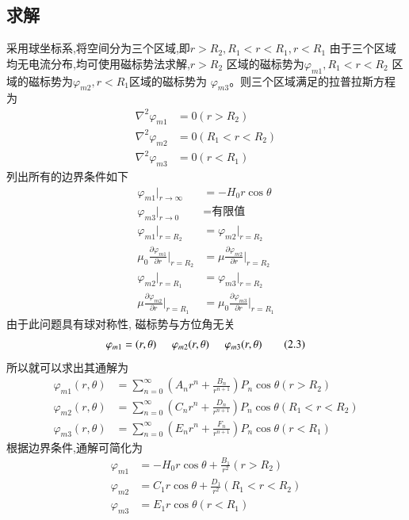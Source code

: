 \documentclass{article}
\begin{document}
\subsection{求解}
采用球坐标系,将空间分为三个区域,即$ r>R_{2},R_{1}<r<R_{1},r<R_{1}$
由于三个区域均无电流分布,均可使用磁标势法求解,$ r>R_{2} $ 区域的磁标势为$ \varphi_{m1},R_{1}<r<R_{2} $
区域的磁标势为$ \varphi_{m2},r<R_{1} $区域的磁标势为 $ \varphi_{m3} $。则三个区域满足的拉普拉斯方程为
\begin{align}
 \nabla^{2}\varphi _{m1}&=0(r>R_{2})\tag{2.1.a}\\  
 \nabla^{2}\varphi _{m2}&=0(R_{1}<r<R_{2})\tag{2.1.b}\\  
 \nabla^{2}\varphi _{m3}&=0(r<R_{1}) \tag{2.1.c}
\end{align}
列出所有的边界条件如下
\begin{align}
\varphi_{m1}|_{r \rightarrow \infty}&=-H_{0}r \cos \theta \tag{2.2.a}\\  
\varphi_{m3}|_{r \rightarrow 0} &=\text{有限值}\tag{2.2.b}\\ 
\varphi_{m1}|_{r=R_{2}}&= \varphi _{m2}|_{r=R_{2}} \tag{2.2.c}\\ 
\mu_{0}\frac{\partial \varphi _{m1}}{\partial r}|_{r=R_{2}}&= \mu \frac{\partial \varphi _{m2}}{\partial r}|_{r=R_{2}} \tag{2.2.d}\\ 
\varphi_{m2}|_{r=R_{1}}&= \varphi _{m3}|_{r=R_{2}} \tag{2.2.e}\\ 
\mu \frac{\partial \varphi _{m2}}{\partial r}|_{r=R_{1}}&= \mu _{0}\frac{\partial \varphi _{m3}}{\partial r}|_{r=R_{1}} \tag{2.2.f} 
\end{align}
由于此问题具有球对称性, 磁标势与方位角无关
\begin{equation}
    \varphi_{m1}=(r, \theta)\hspace{0.5cm}  \varphi _{m2}(r, \theta)\hspace{0.5cm}   \varphi _{m3}(r, \theta)\tag{2.3}
\end{equation}
所以就可以求出其通解为
\begin{align}
    \varphi_{m1}(r, \theta)&= \sum _{n=0}^{\infty}(A_{n}r^{n}+ \frac{B_{n}}{r^{n+1}})P_{n}\cos \theta(r>R_{2}) \tag{2.4.a}\\
 \varphi_{m2}(r, \theta)&= \sum _{n=0}^{\infty}(C_{n}r^{n}+ \frac{D_{n}}{r^{n+1}})P_{n}\cos \theta(R_{1}<r<R_{2}) \tag{2.4.b}\\
\varphi_{m3}(r, \theta)&= \sum _{n=0}^{\infty}(E_{n}r^{n}+ \frac{F_{n}}{r^{n+1}})P_{n}\cos \theta(r<R_{1})  \tag{2.4.c}
\end{align}
根据边界条件,通解可简化为
\begin{align}
    \varphi_{m1}&=-H_{0}r \cos \theta + \frac{B_{1}}{r^{2}}  (r>R_{2})  \tag{2.5.a}\\
    \varphi_{m2}&=C_{1}r \cos \theta + \frac{D_{1}}{r^{2}}(R_{1}<r<R_{2}) \tag{2.5.b}\\
    \varphi_{m3}&=E_{1}r \cos \theta(r<R_{1})\tag{2.5.c}
\end{align}
\end{document}
